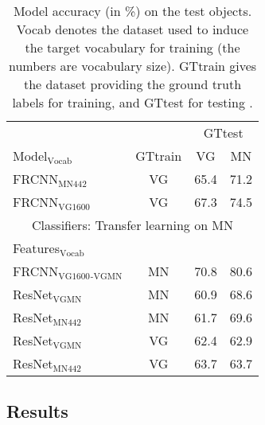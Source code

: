 \fi
\begin{table}[t]
	\centering
	\small
	\begin{tabular}{@{~}l@{~}|@{~}c@{~}|cc@{~}}
		\toprule
		&  & \multicolumn{2}{c}{GTtest} \\
		Model$_{\text{Vocab}}$ &  GTtrain &  VG & MN  \\ 
		\midrule
		FRCNN$_{\text{MN442}}$ & VG &  65.4 &      71.2   \\
		FRCNN$_{\text{VG1600}}$ & VG &    67.3 &      74.5 \\
		\midrule \midrule
		\multicolumn{4}{c}{Classifiers: Transfer learning on MN}\\
		Features$_{\text{Vocab}}$ &   \\
		\midrule 
		FRCNN$_{\text{VG1600}}$$_{\text{-VGMN}}$ & MN &    70.8 &      80.6  \\ 
		\midrule
		ResNet$_{\text{VGMN}}$ & MN  & 60.9 &  68.6   \\
		
		ResNet$_{\text{MN442}}$ & MN &            61.7 &              69.6  \\
		ResNet$_{\text{VGMN}}$  &   VG &  62.4 &              62.9  \\
		ResNet$_{\text{MN442}}$ & VG  &            63.7 &              63.7   \\
		\bottomrule
	\end{tabular}
	\caption{Model accuracy (in \%) on the \mn test objects. Vocab denotes the dataset used to induce the target vocabulary for training (the numbers are vocabulary size). GTtrain gives the dataset providing the ground truth labels for training, and GTtest for testing \label{tab:exp_VGvsMN}.}
\end{table}




\subsection{Results}
\label{sect:exp_results}


